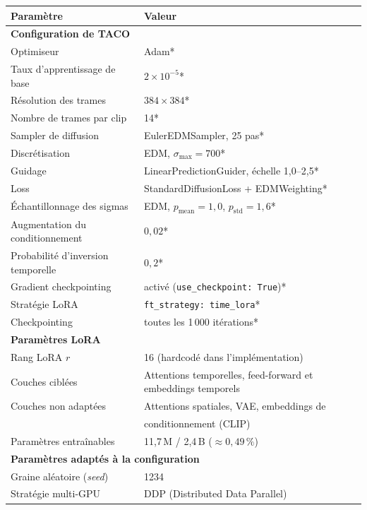 \begin{table}[h]
  \centering
  \begin{tabular}{ll}
    \hline
    \textbf{Paramètre} & \textbf{Valeur} \\
    \hline
    \multicolumn{2}{l}{\textbf{Configuration de TACO}} \\
    Optimiseur & Adam* \\
    Taux d'apprentissage de base & $2 \times 10^{-5}$* \\
    Résolution des trames & $384 \times 384$* \\
    Nombre de trames par clip & 14* \\
    Sampler de diffusion & EulerEDMSampler, 25 pas* \\
    Discrétisation & EDM, $\sigma_{\max} = 700$* \\
    Guidage & LinearPredictionGuider, échelle 1{,}0--2{,}5* \\
    Loss & StandardDiffusionLoss + EDMWeighting* \\
    Échantillonnage des sigmas & EDM, $p_{\text{mean}} = 1{,}0$, $p_{\text{std}} = 1{,}6$* \\
    Augmentation du conditionnement & $0{,}02$* \\
    Probabilité d'inversion temporelle & $0{,}2$* \\
    Gradient checkpointing & activé (\texttt{use\_checkpoint: True})* \\
    Stratégie LoRA & \texttt{ft\_strategy: time\_lora}* \\
    Checkpointing & toutes les 1\,000 itérations* \\
    \hline
    \multicolumn{2}{l}{\textbf{Paramètres LoRA}} \\
    Rang LoRA $r$ & 16 (hardcodé dans l'implémentation) \\
    Couches ciblées & Attentions temporelles, feed-forward et embeddings temporels \\
    Couches non adaptées & Attentions spatiales, VAE, embeddings de \\
    & conditionnement (CLIP) \\
    Paramètres entraînables & 11{,}7\,M / 2{,}4\,B ($\approx 0{,}49\,\%$) \\
    \hline
    \multicolumn{2}{l}{\textbf{Paramètres adaptés à la configuration}} \\
    Graine aléatoire (\textit{seed}) & 1234 \\
    Stratégie multi-GPU & DDP (Distributed Data Parallel) \\

\end{tabular}
\end{table}
